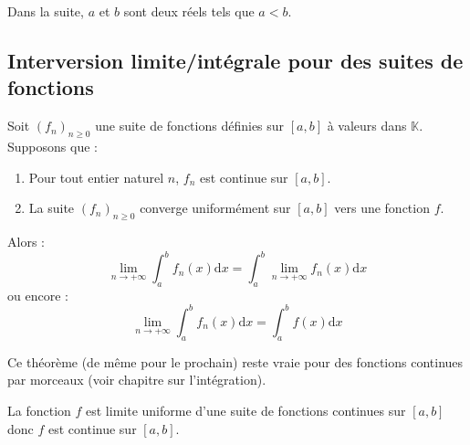 \documentclass[french,11pt,twoside]{VcCours}
\newcommand{\dx}{\text{d}x}
\begin{document}
Dans la suite, $a$ et $b$ sont deux réels tels que $a<b$.

\subsection{Interversion limite/intégrale pour des suites de fonctions}

\begin{Theoreme}{} Soit $(f_n)_{n \geq 0}$ une suite de fonctions définies sur $[a,b]$ à valeurs dans $\mathbb{K}$. Supposons que :

\begin{enumerate}
\item Pour tout entier naturel $n$, $f_n$ est continue sur $[a,b]$.
\item La suite $(f_n)_{n \geq 0}$ converge uniformément sur $[a,b]$ vers une fonction $f$.
\end{enumerate}
Alors :
$$ \lim_{n \rightarrow + \infty} \int_{a}^b f_n(x) \dx = \int_{a}^b \lim_{n \rightarrow + \infty} f_n(x) \dx$$
ou encore :
$$  \lim_{n \rightarrow + \infty} \int_{a}^b f_n(x) \dx = \int_{a}^b f(x) \dx$$
\end{Theoreme}

\begin{Remarque}{} Ce théorème (de même pour le prochain) reste vraie pour des fonctions continues par morceaux (voir chapitre sur l'intégration).
\end{Remarque}

\begin{Demonstration}{} La fonction $f$ est limite uniforme d'une suite de fonctions continues sur $[a,b]$ donc $f$ est continue sur $[a,b]$. 
%
%

\vspace*{9cm}

\end{Demonstration}
\end{document}
